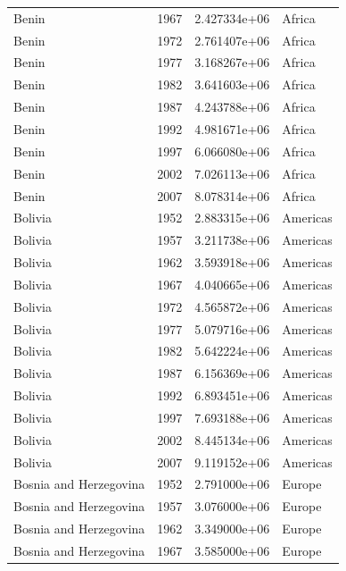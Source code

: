 \documentclass[
  letterpaper,
  DIV=11,
  numbers=noendperiod]{scrreprt}
\begin{document}
\begin{tcolorbox}
\begin{tabular}{lrrl}
Benin                    &  1967 &  2.427334e+06 &    Africa \\
Benin                    &  1972 &  2.761407e+06 &    Africa \\
Benin                    &  1977 &  3.168267e+06 &    Africa \\
Benin                    &  1982 &  3.641603e+06 &    Africa \\
Benin                    &  1987 &  4.243788e+06 &    Africa \\
Benin                    &  1992 &  4.981671e+06 &    Africa \\
Benin                    &  1997 &  6.066080e+06 &    Africa \\
Benin                    &  2002 &  7.026113e+06 &    Africa \\
Benin                    &  2007 &  8.078314e+06 &    Africa \\
Bolivia                  &  1952 &  2.883315e+06 &  Americas \\
Bolivia                  &  1957 &  3.211738e+06 &  Americas \\
Bolivia                  &  1962 &  3.593918e+06 &  Americas \\
Bolivia                  &  1967 &  4.040665e+06 &  Americas \\
Bolivia                  &  1972 &  4.565872e+06 &  Americas \\
Bolivia                  &  1977 &  5.079716e+06 &  Americas \\
Bolivia                  &  1982 &  5.642224e+06 &  Americas \\
Bolivia                  &  1987 &  6.156369e+06 &  Americas \\
Bolivia                  &  1992 &  6.893451e+06 &  Americas \\
Bolivia                  &  1997 &  7.693188e+06 &  Americas \\
Bolivia                  &  2002 &  8.445134e+06 &  Americas \\
Bolivia                  &  2007 &  9.119152e+06 &  Americas \\
Bosnia and Herzegovina   &  1952 &  2.791000e+06 &    Europe \\
Bosnia and Herzegovina   &  1957 &  3.076000e+06 &    Europe \\
Bosnia and Herzegovina   &  1962 &  3.349000e+06 &    Europe \\
Bosnia and Herzegovina   &  1967 &  3.585000e+06 &    Europe \\

\end{tabular}
\end{tcolorbox}
\end{document}

